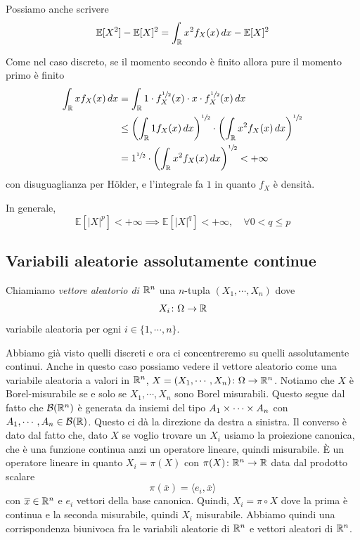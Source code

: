 \documentclass[a4paper]{article}
\begin{document}
Possiamo anche scrivere \[
    \mathbb E[X^2] - \mathbb E[X]^2 = \int_{\mathbb{R}} x^2 f_X(x)\,dx - \mathbb E[X]^2
\]

Come nel caso discreto, se il momento secondo è finito allora pure il momento primo è finito
\begin{align*}
    \int_{\mathbb{R}}  xf_X(x)\,dx &= \int_{\mathbb{R}} 1 \cdot f^{\sfrac12}_X(x)
    \cdot x \cdot f_X^{\sfrac12}(x)\,dx \\
    &\leq \left(\int_{\mathbb{R}} 1 f_X(x)\,dx\right)^{\sfrac12}
    \cdot \left(
        \int_{\mathbb{R}} x^2 f_X(x)\,dx
    \right)^{\sfrac12} \\
    &= 1^{\sfrac12} \cdot \left(
        \int_{\mathbb{R}} x^2 f_X(x)\,dx
    \right)^{\sfrac12} < +\infty
\end{align*}
con disuguaglianza per Hölder, e l'integrale fa \(1\) in quanto \(f_X\) è densità.

In generale,
\[
    \mathbb E[|X|^p] < +\infty \implies \mathbb E[|X|^q] < +\infty, \quad \forall 0<q \leq p
\]

\subsection{Variabili aleatorie assolutamente continue}

\begin{snippetdefinition}{}
    Chiamiamo \emph{vettore aleatorio di \(\mathbb{R}^n\)}
    una \(n\)-tupla \((X_1, \cdots, X_n)\) dove \[
        X_i \colon \Omega \to \mathbb{R}
    \]
    variabile aleatoria per ogni \(i \in \{1, \cdots, n\}\).
\end{snippetdefinition}

Abbiamo già visto quelli discreti e ora ci concentreremo su quelli assolutamente continui.
Anche in questo caso possiamo vedere il vettore aleatorio
come una variabile aleatoria a valori in \(\mathbb{R}^n\),
\(X = (X_1, \cdots, X_n) \colon \Omega \to \mathbb{R}^n\).
Notiamo che \(X\) è Borel-misurabile se e solo se
\(X_1, \cdots, X_n\) sono Borel misurabili.
Questo segue dal fatto che \(\mathcal B(\mathbb{R}^n)\)
è generata da insiemi del tipo \(A_1 \times \cdots \times A_n\)
con \(A_1, \cdots, A_n \in \mathcal B(\mathbb{R})\).
Questo ci dà la direzione da destra a sinistra. Il converso è dato dal fatto che,
dato \(X\) se voglio trovare un \(X_i\) usiamo la proiezione canonica,
che è una funzione continua anzi un operatore lineare, quindi misurabile.
È un operatore lineare in quanto \(X_i = \pi(X)\)
con \(\pi(X) \colon \mathbb{R}^n \to \mathbb{R}\)
data dal prodotto scalare \[
    \pi(\overline x) = \langle e_i, \overline x \rangle
\]
con \(\overline x \in \mathbb{R}^n\)
e \(e_i\) vettori della base canonica.
Quindi, \(X_i = \pi \circ X\) dove la prima è continua e la seconda misurabile, quindi
\(X_i\) misurabile.
Abbiamo quindi una corrispondenza biunivoca fra le variabili
aleatorie di \(\mathbb{R}^n\)
e vettori aleatori di \(\mathbb{R}^n\).
\end{document}
